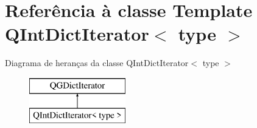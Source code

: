 \hypertarget{class_q_int_dict_iterator}{\section{Referência à classe Template Q\-Int\-Dict\-Iterator$<$ type $>$}
\label{class_q_int_dict_iterator}
}
Diagrama de heranças da classe Q\-Int\-Dict\-Iterator$<$ type $>$\begin{figure}[H]
\begin{center}
\leavevmode
\includegraphics[height=2.000000cm]{class_q_int_dict_iterator}
\end{center}
\end{figure}
